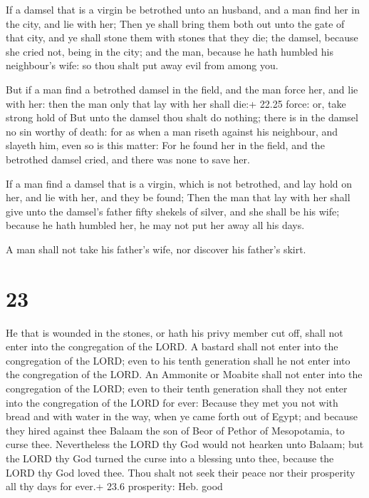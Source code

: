  If a damsel that is a virgin be betrothed unto an
husband, and a man find her in the city, and lie with her; 
Then ye shall bring them both out unto the gate of that city, and ye
shall stone them with stones that they die; the damsel, because she
cried not, being in the city; and the man, because he hath humbled his
neighbour's wife: so thou shalt put away evil from among you.

 But if a man find a betrothed damsel in the field, and
the man force her, and lie with her: then the man only that lay with her
shall die:+ 22.25 force: or, take strong hold of  But unto
the damsel thou shalt do nothing; there is in the damsel no sin worthy
of death: for as when a man riseth against his neighbour, and slayeth
him, even so is this matter:  For he found her in the
field, and the betrothed damsel cried, and there was none to save her.

 If a man find a damsel that is a virgin, which is not
betrothed, and lay hold on her, and lie with her, and they be found;
 Then the man that lay with her shall give unto the
damsel's father fifty shekels of silver, and she shall be his wife;
because he hath humbled her, he may not put her away all his days.

 A man shall not take his father's wife, nor discover his
father's skirt.

\hypertarget{section-22}{%
\section{23}\label{section-22}}

 He that is wounded in the stones, or hath his privy member
cut off, shall not enter into the congregation of the LORD. 
A bastard shall not enter into the congregation of the LORD; even to his
tenth generation shall he not enter into the congregation of the LORD.
 An Ammonite or Moabite shall not enter into the
congregation of the LORD; even to their tenth generation shall they not
enter into the congregation of the LORD for ever:  Because
they met you not with bread and with water in the way, when ye came
forth out of Egypt; and because they hired against thee Balaam the son
of Beor of Pethor of Mesopotamia, to curse thee. 
Nevertheless the LORD thy God would not hearken unto Balaam; but the
LORD thy God turned the curse into a blessing unto thee, because the
LORD thy God loved thee.  Thou shalt not seek their peace
nor their prosperity all thy days for ever.+ 23.6 prosperity: Heb. good

